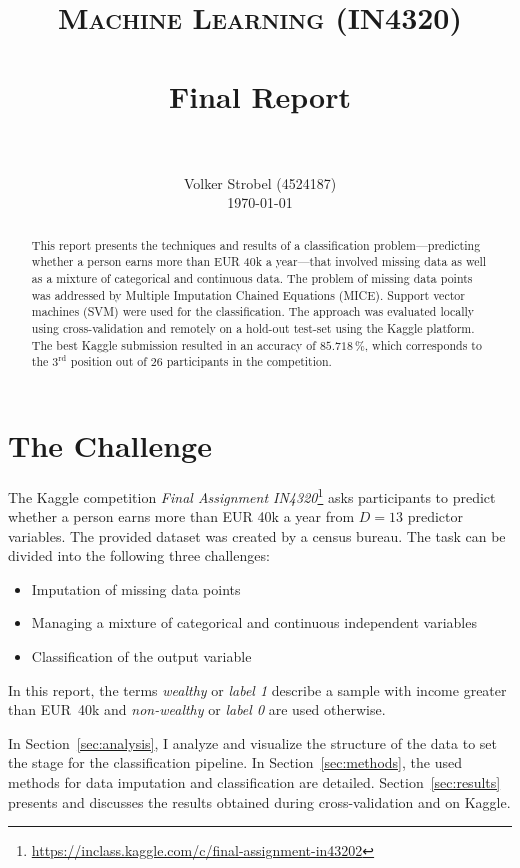 \documentclass[a4paper,11pt]{article}
\title{
		\vspace{0in} 	
		\usefont{OT1}{bch}{b}{n}
		\normalfont \normalsize \textsc{Machine Learning (IN4320)} \\ [10pt]
		\horrule{0.5pt} \\[0.4cm]
		\huge Final Report \\
		\horrule{2pt} \\[0.5cm]
}
\author{
		\normalfont 								\normalsize
        Volker Strobel (4524187)\\[3pt]		\normalsize
        \today
}
\date{}
\begin{document}
\maketitle
\begin{abstract}
  This report presents the techniques and results of a classification
  problem---predicting whether a person earns more than EUR 40k a
  year---that involved missing data as well as a mixture of
  categorical and continuous data. The problem of missing data points
  was addressed by Multiple Imputation Chained Equations
  (MICE). Support vector machines (SVM) were used for the
  classification. The approach was evaluated locally using
  cross-validation and remotely on a hold-out test-set using the
  Kaggle platform. The best Kaggle submission resulted in an accuracy
  of $85.718\,\%$, which corresponds to the $3^{\text{rd}}$ position
  out of $26$ participants in the competition.%
\end{abstract}%
\section{The Challenge}
\label{sec:introduction}

The Kaggle competition \emph{Final Assignment
  IN4320}\footnote{\url{https://inclass.kaggle.com/c/final-assignment-in43202}}
asks participants to predict whether a person earns more than EUR
40k a year from $D = 13$ predictor variables. The provided dataset
was created by a census bureau. The task can be divided into the
following three challenges:

\begin{itemize}
\item Imputation of missing data points
\item Managing a mixture of categorical and continuous independent
  variables
\item Classification of the output variable
\end{itemize}

In this report, the terms \emph{wealthy} or \emph{label 1} describe a
sample with income greater than EUR~40k and \emph{non-wealthy} or \emph{label
  0} are used otherwise.

In Section~\ref{sec:analysis}, I analyze and visualize the structure
of the data to set the stage for the classification pipeline. In
Section~\ref{sec:methods}, the used methods for data imputation and
classification are detailed. Section~\ref{sec:results} presents and
discusses the results obtained during cross-validation and on Kaggle.
\end{document}
